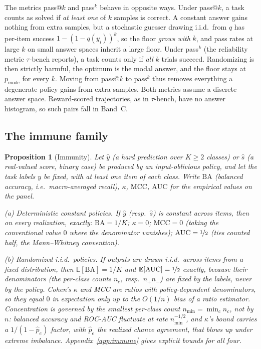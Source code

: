 \documentclass{article}
\theoremstyle{plain}
\newtheorem{proposition}{Proposition}
\theoremstyle{definition}
\begin{document}
The metrics pass@$k$ and pass$^{k}$ behave in opposite ways. Under pass@$k$, a task counts as solved if \emph{at least one} of $k$ samples is correct. A constant answer gains nothing from extra samples, but a stochastic guesser drawing i.i.d.\ from $q$ has per-item success $1-(1-q(y_i))^k$, so the floor \emph{grows with} $k$, and pass rates at large $k$ on small answer spaces inherit a large floor. Under pass$^{k}$ (the reliability metric $\tau$-bench reports), a task counts only if \emph{all} $k$ trials succeed. Randomizing is then strictly harmful, the optimum is the modal answer, and the floor stays at $p_{\mathrm{mode}}$ for every $k$. Moving from pass@$k$ to pass$^{k}$ thus removes everything a degenerate policy gains from extra samples. Both metrics assume a discrete answer space. Reward-scored trajectories, as in $\tau$-bench, have no answer histogram, so such pairs fall in Band~C.

\subsection{The immune family}
\label{sec:immune}

\begin{proposition}[Immunity]
\label{prop:immune}
Let $\hat{y}$ (a hard prediction over $K \ge 2$ classes) or $\hat{s}$ (a real-valued score, binary case) be produced by an input-oblivious policy, and let the task labels $y$ be fixed, with at least one item of each class. Write $\mathrm{BA}$ (balanced accuracy, i.e.\ macro-averaged recall), $\kappa$, $\mathrm{MCC}$, $\mathrm{AUC}$ for the empirical values on the panel.

\emph{(a) Deterministic constant policies.} If $\hat{y}$ (resp.\ $\hat{s}$) is constant across items, then on \emph{every} realization, exactly: $\mathrm{BA} = 1/K$; $\kappa = 0$; $\mathrm{MCC} = 0$ (taking the conventional value $0$ where the denominator vanishes); $\mathrm{AUC} = \nicefrac{1}{2}$ (ties counted half, the Mann--Whitney convention).

\emph{(b) Randomized i.i.d.\ policies.} If outputs are drawn i.i.d.\ across items from a fixed distribution, then $\mathbb{E}[\mathrm{BA}] = 1/K$ and $\mathbb{E}[\mathrm{AUC}] = \nicefrac{1}{2}$ \emph{exactly}, because their denominators (the per-class counts $n_{c}$, resp.\ $n_{+}n_{-}$) are fixed by the labels, never by the policy. Cohen's $\kappa$ and MCC are ratios with policy-dependent denominators, so they equal $0$ in expectation only up to the $O(1/n)$ bias of a ratio estimator. Concentration is governed by the \emph{smallest per-class count} $n_{\min} = \min_c n_c$, not by $n$: balanced accuracy and ROC-AUC fluctuate at rate $n_{\min}^{-1/2}$, and $\kappa$'s bound carries a $1/(1-\hat{p}_e)$ factor, with $\hat{p}_e$ the realized chance agreement, that blows up under extreme imbalance. Appendix~\ref{app:immune} gives explicit bounds for all four.
\end{proposition}
\end{document}
